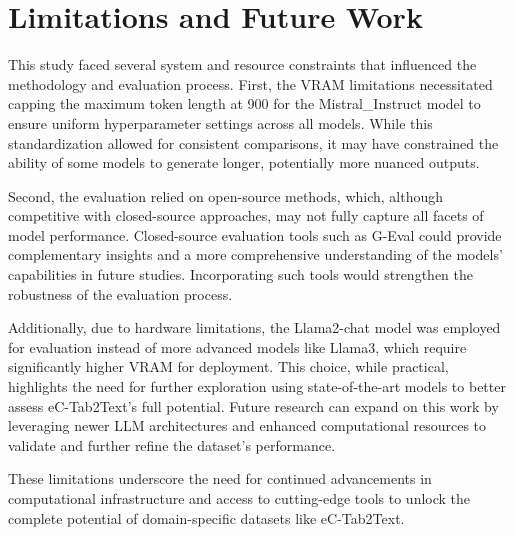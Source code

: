 \section{Limitations and Future Work}
This study faced several system and resource constraints that influenced the methodology and evaluation process. First, the VRAM limitations necessitated capping the maximum token length at 900 for the Mistral\_Instruct model to ensure uniform hyperparameter settings across all models. While this standardization allowed for consistent comparisons, it may have constrained the ability of some models to generate longer, potentially more nuanced outputs.

Second, the evaluation relied on open-source methods, which, although competitive with closed-source approaches, may not fully capture all facets of model performance. Closed-source evaluation tools such as G-Eval\cite{liu2023gevalnlgevaluationusing} could provide complementary insights and a more comprehensive understanding of the models' capabilities in future studies. Incorporating such tools would strengthen the robustness of the evaluation process.

Additionally, due to hardware limitations, the Llama2-chat model was employed for evaluation instead of more advanced models like Llama3, which require significantly higher VRAM for deployment. This choice, while practical, highlights the need for further exploration using state-of-the-art models to better assess eC-Tab2Text's full potential. Future research can expand on this work by leveraging newer LLM architectures and enhanced computational resources to validate and further refine the dataset's performance.

These limitations underscore the need for continued advancements in computational infrastructure and access to cutting-edge tools to unlock the complete potential of domain-specific datasets like eC-Tab2Text.
